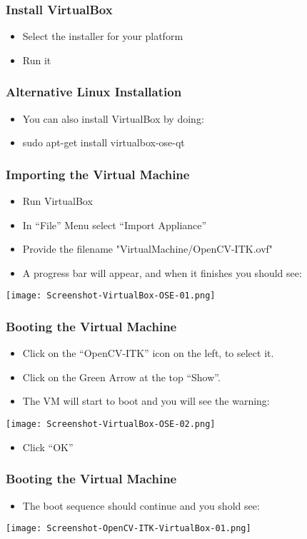 \begin{frame}
\frametitle{Install VirtualBox}
\begin{itemize}
\item Select the installer for your platform
\item Run it
\end{itemize}
\end{frame}

\begin{frame}
\frametitle{Alternative Linux Installation}
\begin{itemize}
\item  You can also install VirtualBox by doing:
\item  sudo apt-get install virtualbox-ose-qt
\end{itemize}
\end{frame}

\begin{frame}
\frametitle{Importing the Virtual Machine}
\begin{itemize}
\item Run VirtualBox
\item In ``File'' Menu select ``Import Appliance''
\item Provide the filename "VirtualMachine/OpenCV-ITK.ovf"
\item A progress bar will appear, and when it finishes you should see:
\end{itemize}
\begin{center}
  \texttt{[image: Screenshot-VirtualBox-OSE-01.png]}
\end{center}
\end{frame}

\begin{frame}
\frametitle{Booting the Virtual Machine}
\begin{itemize}
\item Click on the ``OpenCV-ITK'' icon on the left, to select it.
\item Click on the Green Arrow at the top ``Show''.
\item The VM will start to boot and you will see the warning:
\end{itemize}
\begin{center}
  \texttt{[image: Screenshot-VirtualBox-OSE-02.png]}
\end{center}
\begin{itemize}
\item Click ``OK''
\end{itemize}
\end{frame}

\begin{frame}
\frametitle{Booting the Virtual Machine}
\begin{itemize}
\item The boot sequence should continue and you shold see:
\end{itemize}
\begin{center}
  \texttt{[image: Screenshot-OpenCV-ITK-VirtualBox-01.png]}
\end{center}
\end{frame}

